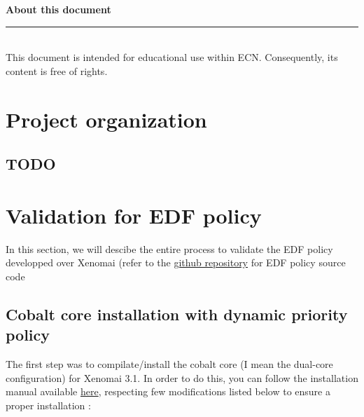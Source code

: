 \documentclass[12pt,hidelinks]{article}
\begin{document}
\newpage

\tableofcontents
\vfill
\small{\noindent \textbf{About this document} \vspace{-3mm}\\
\noindent \rule{3.3cm}{0.5pt} \\
This document is intended for educational use within ECN. Consequently, its content is free of rights.
\newpage
{}
\section{Project organization}
\vspace{4cm}
    


	\subsection{TODO}

    \newline
	\vspace{-1.5mm}
\newpage
\section{Validation for EDF policy}
\vspace{4cm}

In this section, we will descibe the entire process to validate the EDF policy developped over Xenomai (refer to the \href{https://github.com/skyultime/Xenomai-EDH/commit/37aed321405df633a39f17e16ad50599cadb9ed9}{github repository} for EDF policy source code

    \subsection{Cobalt core installation with dynamic priority policy}
    
    The first step was to compilate/install the cobalt core (I mean the dual-core configuration) for Xenomai 3.1.\newline \newline
    In order to do this, you can follow the installation manual available \href{Doc/CobaltCoreXenomaiInstallation/XenomaiEDF-installationGuide-1.pdf}{here}, respecting few modifications listed below to ensure a proper installation :\newline
    
}
\end{document}
